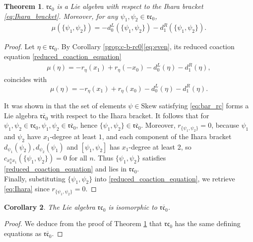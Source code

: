 \documentclass[a4paper,fleqn]{cas-sc}
\newtheorem{theorem}{Theorem}
\newtheorem{corollary}[theorem]{Corollary}
\newcommand{\rc}{\mathfrak{rc}}
\begin{document}
\begin{theorem} \label{theorem:property}
$\mathfrak{rc}_0$ is a Lie algebra with respect to the Ihara bracket \eqref{eq:Ihara_bracket}. Moreover, for any $\psi_1,\psi_2\in \mathfrak{rc}_0$,
%
\begin{align} \label{eq:Ihara}
	\mu(\{\psi_1,\psi_2\})=-d_0^L(\{\psi_1,\psi_2\})-d_1^R(\{\psi_1,\psi_2\}).
\end{align}
\end{theorem}

\begin{proof}
    Let $\eta \in \rc_0$. By Corollary \ref{prop:c-b-rc0}\eqref{eq:even}, its reduced coaction equation \eqref{reduced_coaction_equation}
\begin{align*}
\mu(\eta)=-r_{\eta}(x_1)+r_{\eta}(-x_0)-d^L_0(\eta)-d^R_1(\eta),
\end{align*}
coincides with
\begin{equation}\label{eq:bar_rc}
		\mu(\eta)=-r_{\eta}(x_1)+r_{\eta}(x_0)-d^L_0(\eta)-d^R_1(\eta).
\end{equation}

It was shown in \cite{Ren2025} that the set of elements $\psi \in \mathrm{Skew}$ satisfying \eqref{eq:bar_rc} forms a Lie algebra  $\overline{\rc_0}$ with respect to the Ihara bracket. It follows that for $\psi_1, \psi_2 \in \rc_0, \psi_1, \psi_2 \in \overline{\rc_0}$, hence $\{\psi_1, \psi_2 \} \in \overline{\rc_0}$. Moreover, $r_{\{\psi_1, \psi_2\}} = 0$, because $\psi_1$ and $\psi_2$ have $x_1$-degree at least $1$, and each component of the Ihara bracket $d_{\psi_1}({\psi_2}), d_{\psi_2}({\psi_1})$ and $[\psi_1, \psi_2]$ has $x_1$-degree at least 2, so $c_{x_0^n x_1}(\{\psi_1, \psi_2\}) = 0$ for all $n$. %
Thus $\{\psi_1, \psi_2\}$ satisfies \eqref{reduced_coaction_equation} and lies in $\rc_0$. \\

Finally, substituting $\{\psi_1, \psi_2\}$ into \eqref{reduced_coaction_equation}, we retrieve \eqref{eq:Ihara} since $r_{\{\psi_1, \psi_2\}} = 0$. 

\end{proof}

\begin{corollary}
    The Lie algebra $\mathfrak{rc}_0$ is isomorphic to $\overline{\mathfrak{rc}_0}$.
\end{corollary}

\begin{proof}
    We deduce from the proof of Theorem \ref{theorem:property} that $\mathfrak{rc}_0$ has the same defining equations as $\overline{\mathfrak{rc}_0}$.
\end{proof}
\end{document}
